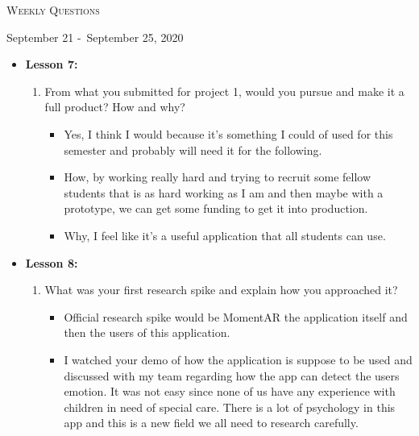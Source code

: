 \centerline{\LARGE\textsc{Weekly Questions}}
\centerline{September 21 -\ September 25, 2020}
\textbf{}
\begin{itemize}
  \item[] \textbf{\large Lesson 7:}
  \begin{enumerate}
    \item From what you submitted for project 1, would you pursue and make it a full product? How and why?
    \begin{itemize}
      \item Yes, I think I would because it's something I could of used for this semester and probably will need it for the following. 
      \item How, by working really hard and trying to recruit some fellow students that is as hard working as I am and then maybe with 
      a prototype, we can get some funding to get it into production.
      \item Why, I feel like it's a useful application that all students can use.
    \end{itemize}
  \end{enumerate} 
\end{itemize}
\begin{itemize}
  \item[] \textbf{\large Lesson 8:}
  \begin{enumerate}
    \item What was your first research spike and explain how you approached it?
    \begin{itemize}
      \item Official research spike would be MomentAR the application itself and then the users of this application.
      \item I watched your demo of how the application is suppose to be used and discussed with my team regarding how
      the app can detect the users emotion. It was not easy since none of us have any experience with children in need
      of special care. There is a lot of psychology in this app and this is a new field we all need to research carefully.
    \end{itemize}
  \end{enumerate} 
\end{itemize}
